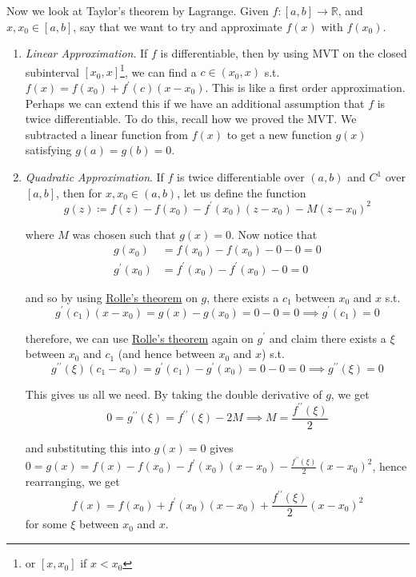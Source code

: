 	Now we look at Taylor's theorem by Lagrange. Given $f: [a, b] \to \mathbb{R}$, and $x, x_0 \in [a, b]$, say that we want to try and approximate $f(x)$ with $f(x_0)$. 
	\begin{enumerate}
	  \item \textit{Linear Approximation}. If $f$ is differentiable, then by using MVT on the closed subinterval $[x_0, x]$\footnote{or $[x, x_0]$ if $x < x_0$}, we can find a $c \in (x_0, x)$ s.t. $f(x) = f(x_0) + f^\prime (c) (x - x_0)$. This is like a first order approximation. Perhaps we can extend this if we have an additional assumption that $f$ is twice differentiable. To do this, recall how we proved the MVT. We subtracted a linear function from $f(x)$ to get a new function $g(x)$ satisfying $g(a) = g(b) = 0$. 

		\item \textit{Quadratic Approximation}. If $f$ is twice differentiable over $(a, b)$ and $C^1$ over $[a, b]$, then for $x, x_0 \in (a, b)$, let us define the function 
    \begin{equation}
      g(z) \coloneqq f(z) - f(x_0) - f^\prime (x_0) (z - x_0) - M (z - x_0)^2
    \end{equation} 

    where $M$ was chosen such that $g(x) = 0$. Now notice that 
    \begin{align}
      g(x_0) & = f(x_0) - f(x_0) - 0 - 0 = 0 \\ 
      g^\prime (x_0) & = f^\prime (x_0) - f^\prime (x_0) - 0 = 0 
    \end{align}

    and so by using \hyperref[thm:rolle]{Rolle's theorem} on $g$, there exists a $c_1$ between $x_0$ and $x$ s.t. 
    \begin{equation}
      g^\prime (c_1) (x - x_0) = g(x) - g(x_0) = 0 - 0 = 0 \implies g^\prime (c_1) = 0
    \end{equation}  

    therefore, we can use \hyperref[thm:rolle]{Rolle's theorem} again on $g^\prime$ and claim there exists a $\xi$ between $x_0$ and $c_1$ (and hence between $x_0$ and $x$) s.t. 
    \begin{equation}
      g^{\prime\prime} (\xi) (c_1 - x_0) = g^\prime (c_1) - g^\prime (x_0) = 0 - 0 = 0 \implies g^{\prime\prime} (\xi) = 0
    \end{equation}

    This gives us all we need. By taking the double derivative of $g$, we get 
    \begin{equation}
      0 = g^{\prime\prime} (\xi) = f^{\prime\prime} (\xi) - 2M \implies M = \frac{f^{\prime\prime} (\xi)}{2}
    \end{equation}

    and substituting this into $g(x) = 0$ gives $0 = g(x) = f(x) - f(x_0) - f^\prime (x_0) (x - x_0) - \frac{f^{\prime\prime} (\xi)}{2} (x - x_0)^2$, hence rearranging, we get 
    \begin{equation}
      f(x) = f(x_0) + f^\prime (x_0) (x - x_0) + \frac{f^{\prime \prime}(\xi)}{2} (x - x_0)^2
    \end{equation} 
		for some $\xi$ between $x_0$ and $x$. 
	\end{enumerate}

